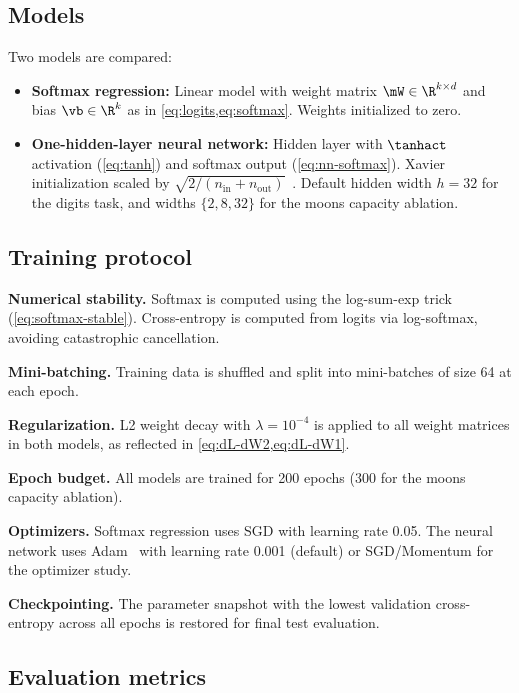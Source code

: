 \documentclass[sigconf,screen,nonacm]{acmart}
\begin{document}
\subsection{Models}
\label{sec:models}

Two models are compared:
\begin{itemize}[leftmargin=*]
    \item \textbf{Softmax regression:} Linear model with weight matrix $\mW \in \R^{k \times d}$ and bias $\vb \in \R^k$ as in \cref{eq:logits,eq:softmax}. Weights initialized to zero.
    \item \textbf{One-hidden-layer neural network:} Hidden layer with $\tanhact$ activation (\cref{eq:tanh}) and softmax output (\cref{eq:nn-softmax}). Xavier initialization scaled by $\sqrt{2/(n_{\text{in}} + n_{\text{out}})}$~\cite{goodfellow2016deep}. Default hidden width $h{=}32$ for the digits task, and widths $\{2, 8, 32\}$ for the moons capacity ablation.
\end{itemize}

\subsection{Training protocol}
\label{sec:training}

\textbf{Numerical stability.} Softmax is computed using the log-sum-exp trick (\cref{eq:softmax-stable}). Cross-entropy is computed from logits via log-softmax, avoiding catastrophic cancellation.

\textbf{Mini-batching.} Training data is shuffled and split into mini-batches of size 64 at each epoch.

\textbf{Regularization.} L2 weight decay with $\lambda = 10^{-4}$ is applied to all weight matrices in both models, as reflected in \cref{eq:dL-dW2,eq:dL-dW1}.

\textbf{Epoch budget.} All models are trained for 200 epochs (300 for the moons capacity ablation).

\textbf{Optimizers.} Softmax regression uses SGD with learning rate 0.05. The neural network uses Adam~\cite{goodfellow2016deep} with learning rate 0.001 (default) or SGD/Momentum for the optimizer study.

\textbf{Checkpointing.} The parameter snapshot with the lowest validation cross-entropy across all epochs is restored for final test evaluation.

\subsection{Evaluation metrics}
\label{sec:metrics}
\end{document}

